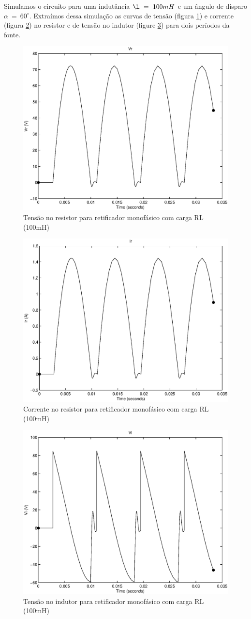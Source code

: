 \documentclass{report}
\begin{document}
Simulamos o circuito para uma indutância $\L\ =\ 100mH$ e um ângulo de disparo $\alpha\ =\ 60^\circ$. Extraímos dessa simulação as curvas de tensão (figura \ref{fig:rlvr}) e corrente (figura \ref{fig:rlir}) no resistor e de tensão no indutor (figure \ref{fig:rlvl}) para dois períodos da fonte.
\begin{figure}[H]
	\centering
	\includegraphics[width=0.7\linewidth]{matlab/rl_vr}
	\caption{Tensão no resistor para retificador monofásico com carga RL (100mH)}
	\label{fig:rlvr}
\end{figure}
\begin{figure}[H]
	\centering
	\includegraphics[width=0.7\linewidth]{matlab/rl_ir}
	\caption{Corrente no resistor para retificador monofásico com carga RL (100mH)}
	\label{fig:rlir}
\end{figure}
\begin{figure}[H]
	\centering
	\includegraphics[width=0.7\linewidth]{matlab/rl_vl}
	\caption{Tensão no indutor para retificador monofásico com carga RL (100mH)}
	\label{fig:rlvl}
\end{figure}
\end{document}
